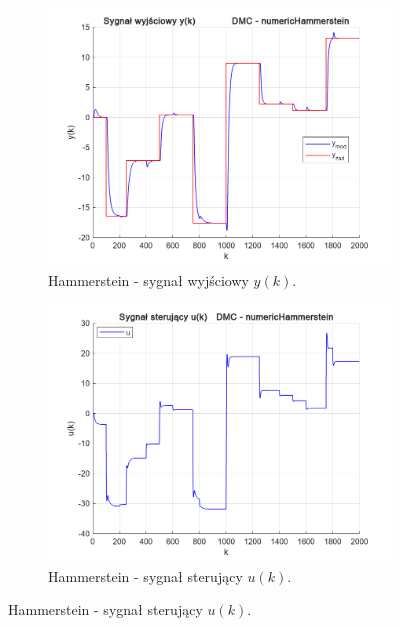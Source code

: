 \begin{figure}[b!]
\centering
\begin{subfigure}[b]{0.49\paperwidth}
\centering
\includegraphics[width=\linewidth]{pictures/y_numericHammerstein}
\caption{Hammerstein - sygnał wyjściowy $y(k)$.}
\end{subfigure}
\hfill
\begin{subfigure}[b]{0.49\paperwidth}
\centering
\includegraphics[width=\linewidth]{pictures/u_numericHammerstein}
\caption{Hammerstein -  sygnał sterujący $u(k)$.}
\end{subfigure}
    
\vspace{0.5cm} %


\end{figure}
